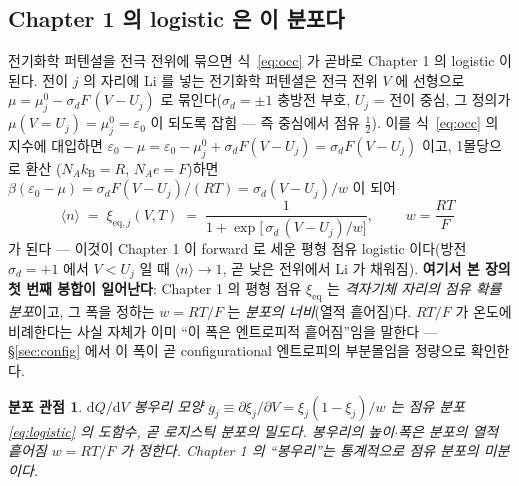 \documentclass[11pt,a4paper]{article}
\newtheorem*{distbox}{분포 관점}
\newcommand{\dd}{\mathrm{d}}
\newcommand{\eq}{\mathrm{eq}}
\newcommand{\kB}{k_{\mathrm{B}}}
\newcommand{\avg}[1]{\langle #1\rangle}
\begin{document}
\subsection{Chapter 1 의 logistic 은 이 분포다}
전기화학 퍼텐셜을 전극 전위에 묶으면 식~\eqref{eq:occ} 가 곧바로 Chapter 1 의 logistic 이 된다.
전이 $j$ 의 자리에 Li 를 넣는 전기화학 퍼텐셜은 전극 전위 $V$ 에 선형으로 $\mu=\mu_j^0-\sigma_d F\,(V-U_j)$
로 묶인다($\sigma_d=\pm1$ 충방전 부호, $U_j$ = 전이 중심, 그 정의가 $\mu(V{=}U_j)=\mu_j^0=\varepsilon_0$
이 되도록 잡힘 — 즉 중심에서 점유 $\tfrac12$). 이를 식~\eqref{eq:occ} 의 지수에 대입하면
$\varepsilon_0-\mu=\varepsilon_0-\mu_j^0+\sigma_d F(V-U_j)=\sigma_d F(V-U_j)$ 이고, 1몰당으로 환산
($N_A\kB=R$, $N_A e=F$)하면 $\beta(\varepsilon_0-\mu)=\sigma_d F(V-U_j)/(RT)=\sigma_d(V-U_j)/w$ 이
되어
\begin{equation}
\avg{n}\;=\;\xi_{\eq,j}(V,T)\;=\;\frac{1}{1+\exp\!\big[\,\sigma_d\,(V-U_j)/w\big]},
\qquad
\boxed{\;w=\frac{RT}{F}\;}
\label{eq:logistic}
\end{equation}
가 된다 — 이것이 Chapter 1 이 forward 로 세운 평형 점유 logistic 이다(방전 $\sigma_d{=}+1$ 에서
$V\!<\!U_j$ 일 때 $\avg{n}\to1$, 곧 낮은 전위에서 Li 가 채워짐). \textbf{여기서 본 장의 첫
번째 봉합이 일어난다}: Chapter 1 의 평형 점유 $\xi_\eq$ 는 \emph{격자기체 자리의 점유 확률 분포}이고,
그 폭을 정하는 $w=RT/F$ 는 \emph{분포의 너비}(열적 흩어짐)다. $RT/F$ 가 온도에 비례한다는 사실 자체가
이미 ``이 폭은 엔트로피적 흩어짐''임을 말한다 — \S\ref{sec:config} 에서 이 폭이 곧 configurational
엔트로피의 부분몰임을 정량으로 확인한다.

\begin{distbox}
$\dd Q/\dd V$ 봉우리 모양 $g_j\equiv\partial\xi_j/\partial V = \xi_j(1-\xi_j)/w$ 는 점유 분포
\eqref{eq:logistic} 의 \emph{도함수}, 곧 로지스틱 분포의 밀도다. 봉우리의 높이$\cdot$폭은 분포의
열적 흩어짐 $w=RT/F$ 가 정한다. Chapter 1 의 ``봉우리''는 통계적으로 \emph{점유 분포의 미분}이다.
\end{distbox}
\end{document}
